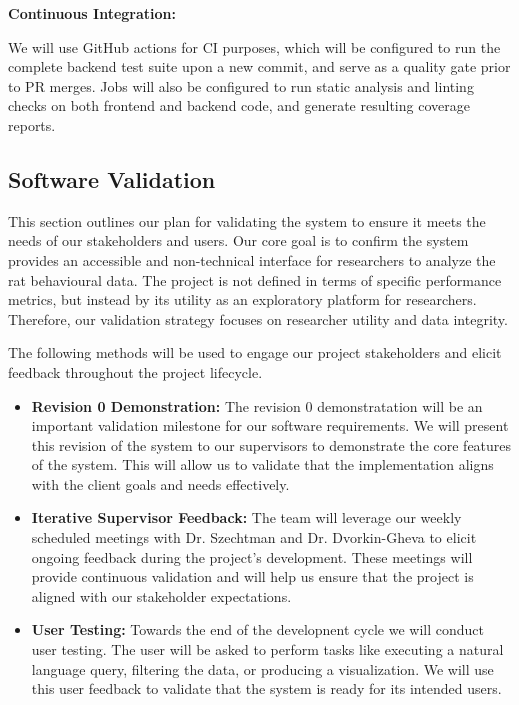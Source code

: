 \documentclass[12pt, titlepage]{article}
\begin{document}
\textbf{Continuous Integration:}

We will use GitHub actions for CI purposes, which will be configured to run the complete backend test suite 
upon a new commit, and serve as a quality gate prior to PR merges. Jobs will also be configured to run 
static analysis and linting checks on both frontend and backend code, and generate resulting coverage reports. 

\subsection{Software Validation}

This section outlines our plan for validating the system to ensure it meets the needs of our 
stakeholders and users. Our core goal is to confirm the system provides an accessible and non-technical 
interface for researchers to analyze the rat behavioural data. The project is not defined in terms of 
specific performance metrics, but instead by its utility as an exploratory platform for researchers. 
Therefore, our validation strategy focuses on researcher utility and data integrity. 

The following methods will be used to engage our project stakeholders and elicit feedback throughout the project lifecycle. 

\begin{itemize}
  \item \textbf{Revision 0 Demonstration:}  The revision 0 demonstratation will be an important validation milestone for our software requirements. We will present this revision of the system to our supervisors to demonstrate the core features of the system. This will allow us to validate that the implementation aligns with the client goals and needs effectively. 
  \item \textbf{Iterative Supervisor Feedback:} The team will leverage our weekly scheduled meetings with Dr. Szechtman and Dr. Dvorkin-Gheva to elicit ongoing feedback during the project's development. These meetings will provide continuous validation and will help us ensure that the project is aligned with our stakeholder expectations.  
  \item \textbf{User Testing:} Towards the end of the developnent cycle we will conduct user testing. The user will be asked to perform tasks like executing a natural language query, filtering the data, or producing a visualization. We will use this user feedback to validate that the system is ready for its intended users.  
 \end{itemize}
\end{document}
